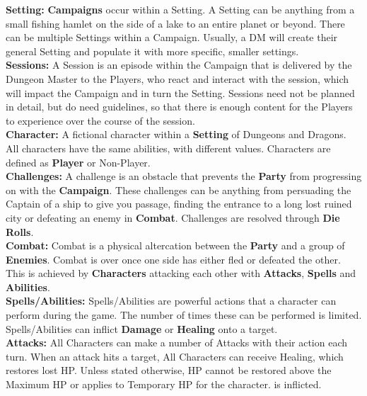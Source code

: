 \documentclass[progress]{cmpreport}
\begin{document}
	\textbf{Setting:} \textbf{Campaigns} occur within a Setting. A Setting can be anything from a small fishing hamlet on the side of a lake to an entire planet or beyond. There can be multiple Settings within a Campaign. Usually, a DM will create their general Setting and populate it with more specific, smaller settings.\\
	
	\textbf{Sessions:} A Session is an episode within the Campaign that is delivered by the Dungeon Master to the Players, who react and interact with the session, which will impact the Campaign and in turn the Setting. Sessions need not be planned in detail, but do need guidelines, so that there is enough content for the Players to experience over the course of the session. \\
	
	\textbf{Character:} A fictional character within a \textbf{Setting} of Dungeons and Dragons. All characters have the same abilities, with different values. Characters are defined as \textbf{Player} or Non-Player. \\
	
	\textbf{Challenges:} A challenge is an obstacle that prevents the \textbf{Party} from progressing on with the \textbf{Campaign}. These challenges can be anything from persuading the Captain of a ship to give you passage, finding the entrance to a long lost ruined city or defeating an enemy in \textbf{Combat}. Challenges are resolved through \textbf{Die Rolls}. \\
	
	\textbf{Combat:} Combat is a physical altercation between the \textbf{Party} and a group of \textbf{Enemies}. Combat is over once one side has either fled or defeated the other. This is achieved by \textbf{Characters} attacking each other with \textbf{Attacks}, \textbf{Spells} and \textbf{Abilities}. \\
	
	\textbf{Spells/Abilities:} 	Spells/Abilities are powerful actions that a character can perform during the game. The number of times these can be performed is limited. Spells/Abilities can inflict \textbf{Damage} or \textbf{Healing} onto a target. \\
	
	\textbf{Attacks:} All Characters can make a number of Attacks with their action each turn. When an attack hits a target, All Characters can receive Healing, which restores lost HP. Unless stated otherwise, HP cannot be restored above the Maximum HP or applies to Temporary HP for the character. is inflicted. \\
	
\end{document}
